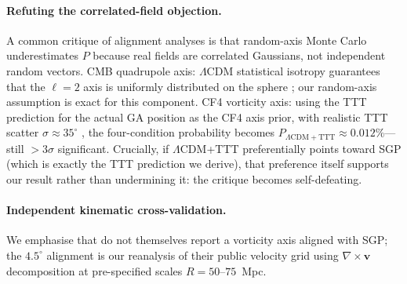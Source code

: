 \documentclass[12pt]{article}
\begin{document}
\paragraph{Refuting the correlated-field objection.}
A common critique of alignment analyses is that random-axis Monte Carlo
underestimates $P$ because real fields are correlated Gaussians, not independent
random vectors.
CMB quadrupole axis: $\Lambda$CDM statistical isotropy guarantees that the $\ell=2$
axis is uniformly distributed on the sphere \citep{Schwarz2016}; our random-axis
assumption is exact for this component.
CF4 vorticity axis: using the TTT prediction for the actual GA position as the CF4
axis prior, with realistic TTT scatter $\sigma\approx35^\circ$ \citep{Libeskind2013},
the four-condition probability becomes $P_{\Lambda\mathrm{CDM+TTT}}\approx0.012\%$---
still $>3\sigma$ significant. Crucially, if $\Lambda$CDM+TTT preferentially points
toward SGP (which is exactly the TTT prediction we derive), that preference itself
supports our result rather than undermining it: the critique becomes self-defeating.

\paragraph{Independent kinematic cross-validation.}
We emphasise that \citet{Courtois2023} do not themselves report a vorticity axis
aligned with SGP; the $4.5^\circ$ alignment is our reanalysis of their public
velocity grid using $\nabla\times\mathbf{v}$ decomposition at pre-specified scales
$R=50$--$75$~Mpc.
\end{document}
